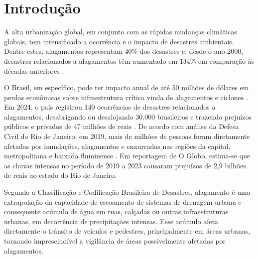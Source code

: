 



\chapter{Introdução}\label{cap:introducao}

A alta urbanização global, em conjunto com as rápidas mudanças climáticas globais, tem intensificado a ocorrência e o impacto de desastres ambientais.
Dentre estes, alagamentos representam 40\% dos desastres e, desde o ano 2000, desastres relacionados a alagamentos têm aumentado em 134\% em comparação às décadas anteriores \cite{gar2025}.

O Brasil, em específico, pode ter impacto anual de até 50 milhões de dólares em perdas econômicas sobre infraestrutura crítica vinda de alagamentos e ciclones \cite{gar2025map}.
Em 2024, o país registrou 140 ocorrências de desastres relacionados a alagamentos, desabrigando ou desalojando 30.000 brasileiros e trazendo prejuízos públicos e privados de 47 milhões de reais \cite{addb2025}.
De acordo com análise da Defesa Civil do Rio de Janeiro, em 2019, mais de milhões de pessoas foram diretamente afetadas por inundações, alagamentos e enxurradas nas regiões da capital, metropolitana e baixada fluminense \cite{defesacivil2019}.
Em reportagem de O Globo, estima-se que as chuvas intensas no período de 2019 a 2023 causaram prejuízos de 2,9 bilhões de reais ao estado do Rio de Janeiro.

Segundo a Classificação e Codificação Brasileira de Desastres, alagamento é uma extrapolação da capacidade de escoamento de sistemas de drenagem urbana e consequente acúmulo de água em ruas,
calçadas ou outras infraestruturas urbanas, em decorrência de precipitações intensas. Esse acúmulo afeta diretamente o trânsito de veículos e pedestres, principalmente em áreas urbanas,
tornando imprescindível a vigilância de áreas possivelmente afetadas por alagamentos.

